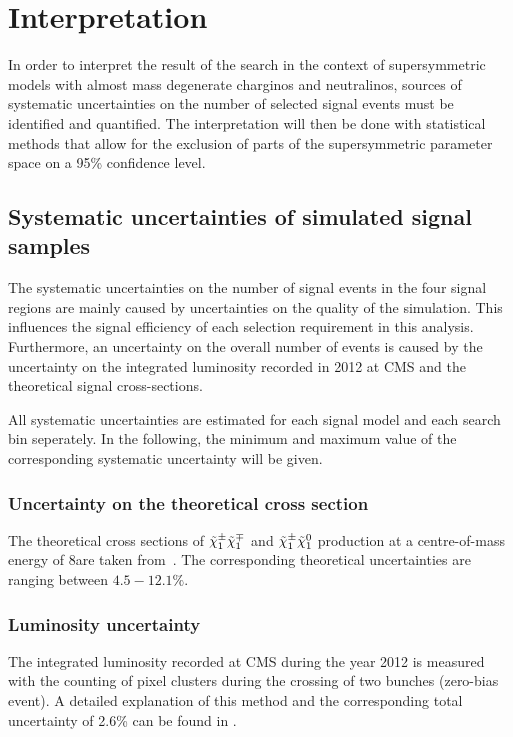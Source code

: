 \FloatBarrier
\chapter{Interpretation}
\label{sec:Interpretation}
In order to interpret the result of the search in the context of supersymmetric models with almost mass degenerate charginos and neutralinos, sources of systematic uncertainties on the number of selected signal events must be identified and quantified.
The interpretation will then be done with statistical methods that allow for the exclusion of parts of the supersymmetric parameter space on a 95\% confidence level.

\section{Systematic uncertainties of simulated signal samples}
The systematic uncertainties on the number of signal events in the four signal regions are mainly caused by uncertainties on the quality of the simulation.
This influences the signal efficiency of each selection requirement in this analysis.
Furthermore, an uncertainty on the overall number of events is caused by the uncertainty on the integrated luminosity recorded in 2012 at CMS and the theoretical signal cross-sections.

All systematic uncertainties are estimated for each signal model and each search bin seperately.
In the following, the minimum and maximum value of the corresponding systematic uncertainty will be given.

\subsection*{Uncertainty on the theoretical cross section}
The theoretical cross sections of $\tilde{\chi}^{\pm}_{1}\tilde{\chi}^{\mp}_{1}$ and $\tilde{\chi}^{\pm}_{1}\tilde{\chi}^{0}_{1}$ production at a centre-of-mass energy of 8\tev are taken from~\cite{bib:SignalCrossSection_2012,bib:SignalCrossSection_2013}.
The corresponding theoretical uncertainties are ranging between $4.5-12.1\%$.

\subsection*{Luminosity uncertainty}
The integrated luminosity recorded at CMS during the year 2012 is measured with the counting of pixel clusters during the crossing of two bunches (zero-bias event).
A detailed explanation of this method and the corresponding total uncertainty of 2.6\% can be found in \cite{bib:CMS:Lumi_PAS}.

